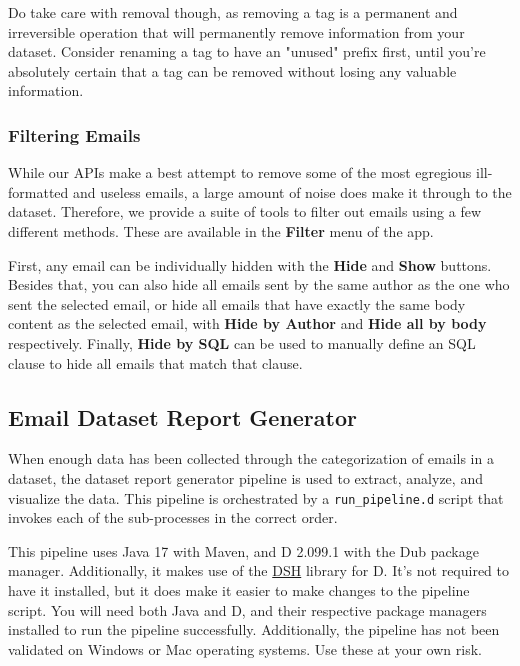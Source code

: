 \documentclass[a4paper, 12pt]{article}
\begin{document}
			\footnotesize
			Do take care with removal though, as removing a tag is a permanent and irreversible operation that will permanently remove information from your dataset. Consider renaming a tag to have an "unused" prefix first, until you're absolutely certain that a tag can be removed without losing any valuable information.
			\normalsize
			
		\subsubsection{Filtering Emails}
			While our APIs make a best attempt to remove some of the most egregious ill-formatted and useless emails, a large amount of noise does make it through to the dataset. Therefore, we provide a suite of tools to filter out emails using a few different methods. These are available in the \textbf{Filter} menu of the app.
			
			First, any email can be individually hidden with the \textbf{Hide} and \textbf{Show} buttons. Besides that, you can also hide all emails sent by the same author as the one who sent the selected email, or hide all emails that have exactly the same body content as the selected email, with \textbf{Hide by Author} and \textbf{Hide all by body} respectively. Finally, \textbf{Hide by SQL} can be used to manually define an SQL clause to hide all emails that match that clause.
	
	\newpage
	\subsection{Email Dataset Report Generator}
		\label{sec:email-dataset-report-generator}
		When enough data has been collected through the categorization of emails in a dataset, the dataset report generator pipeline is used to extract, analyze, and visualize the data. This pipeline is orchestrated by a \texttt{run\_pipeline.d} script that invokes each of the sub-processes in the correct order.
		
		This pipeline uses Java 17 with Maven, and D 2.099.1 with the Dub package manager. Additionally, it makes use of the \href{https://github.com/andrewlalis/dsh}{DSH} library for D. It's not required to have it installed, but it does make it easier to make changes to the pipeline script. You will need both Java and D, and their respective package managers installed to run the pipeline successfully. Additionally, the pipeline has not been validated on Windows or Mac operating systems. Use these at your own risk.
		
\end{document}
